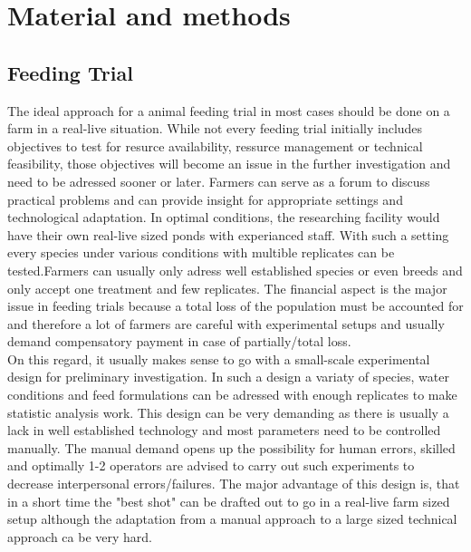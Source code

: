 






\chapter{Material and methods}

\section{Feeding Trial}

The ideal approach for a animal feeding trial in most cases should be done on a farm in a real-live situation. While not every feeding trial initially includes objectives to test for resurce availability, ressurce management or technical feasibility, those objectives will become an issue in the further investigation and need to be adressed sooner or later. Farmers can serve as a forum to discuss practical problems and can provide
insight for appropriate settings and technological adaptation. In optimal conditions, the researching facility would have their own real-live sized ponds with experianced staff. With such a setting every species under various conditions with multible replicates can be tested.Farmers can usually only adress well established species or even breeds  and only accept one treatment and few replicates. The financial aspect is the major issue in feeding trials because a total loss of the  population must be accounted for and therefore a lot of farmers are careful with experimental setups and usually demand compensatory payment in case of partially/total loss. \\

On this regard, it usually makes sense to go with a small-scale experimental design for preliminary investigation. In such a design a variaty of species, water conditions and feed formulations can be adressed with enough replicates to make statistic analysis work. This design can be very demanding as there is usually a lack in well established technology and most parameters need to be controlled manually. The manual demand opens up the possibility for human errors, skilled and optimally 1-2 operators are advised to carry out such experiments to decrease interpersonal errors/failures. The major advantage of this design is, that in a short time the "best shot" can be drafted out to go in a real-live farm sized setup although the adaptation from a manual approach to a large sized technical approach ca be very hard.\\

